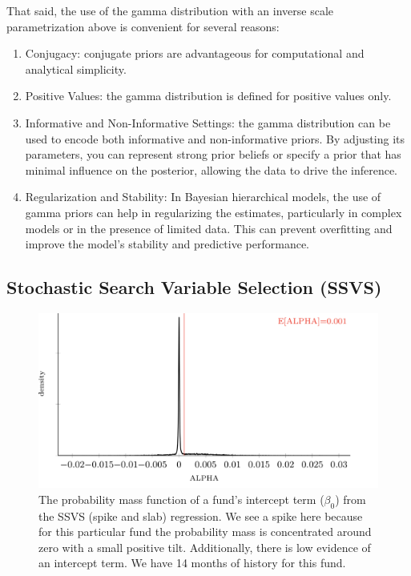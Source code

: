 \documentclass[11pt]{article}
\begin{document}
That said, the use of the gamma distribution with an inverse scale parametrization above is convenient for several reasons:
\begin{enumerate}
	\item Conjugacy: conjugate priors are advantageous for computational and analytical simplicity. 
	\item Positive Values: the gamma distribution is defined for positive values only.
	\item Informative and Non-Informative Settings: the gamma distribution can be used to encode both informative and non-informative priors. By adjusting its parameters, you can represent strong prior beliefs or specify a prior that has minimal influence on the posterior, allowing the data to drive the inference.
	\item Regularization and Stability: In Bayesian hierarchical models, the use of gamma priors can help in regularizing the estimates, particularly in complex models or in the presence of limited data. This can prevent overfitting and improve the model's stability and predictive performance.
\end{enumerate}


\subsection{Stochastic Search Variable Selection (SSVS)}
\label{subsec:spike_and_slab}

\begin{figure}[!h]
	\centering
	\includegraphics[width=400pt]{clinton_alpha_1_ares.png}
	\parbox{400pt}{\caption{The probability mass function of a fund's intercept term ($\beta_0$) from the SSVS (spike and slab) regression. We see a spike here because for this particular fund the probability mass is concentrated around zero with a small positive tilt. Additionally, there is low evidence of an intercept term. We have 14 months of history for this fund. }}
\end{figure}
\end{document}
